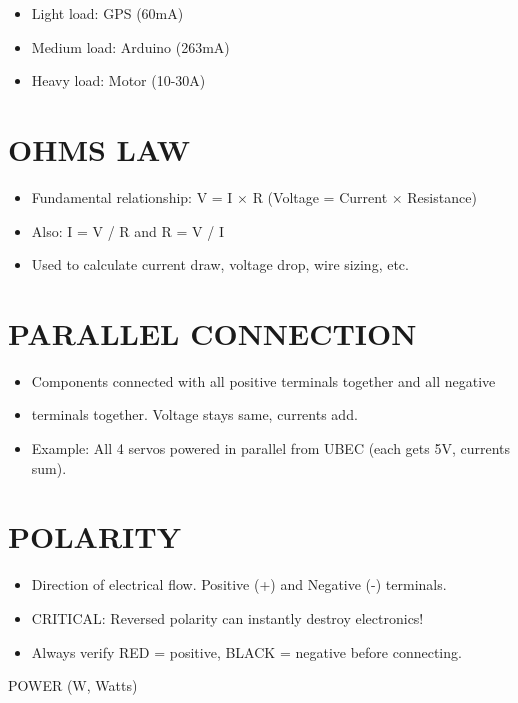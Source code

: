 \documentclass[11pt,letterpaper]{article}
\begin{document}
\begin{itemize}
  \item Light load: GPS (60mA)
  \item Medium load: Arduino (263mA)
  \item Heavy load: Motor (10-30A)
\end{itemize}

\section{OHMS LAW}

\begin{itemize}
  \item Fundamental relationship: V = I $\times$ R (Voltage = Current $\times$ Resistance)
  \item Also: I = V / R and R = V / I
  \item Used to calculate current draw, voltage drop, wire sizing, etc.
\end{itemize}

\section{PARALLEL CONNECTION}

\begin{itemize}
  \item Components connected with all positive terminals together and all negative
  \item terminals together. Voltage stays same, currents add.
  \item Example: All 4 servos powered in parallel from UBEC (each gets 5V, currents sum).
\end{itemize}

\section{POLARITY}

\begin{itemize}
  \item Direction of electrical flow. Positive (+) and Negative (-) terminals.
  \item [WARNING] CRITICAL: Reversed polarity can instantly destroy electronics!
  \item Always verify RED = positive, BLACK = negative before connecting.
\end{itemize}

POWER (W, Watts)\par
\end{document}

